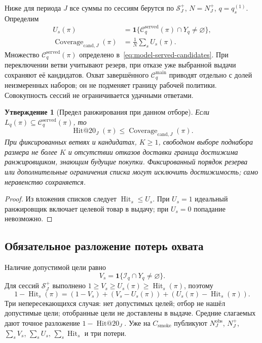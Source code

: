 \documentclass[12pt,a4paper]{article}
\newcommand{\ind}{\mathbf 1}
\theoremstyle{plainru}
\newtheorem{proposition}{Утверждение}[section]
\begin{document}
Ниже для периода $J$ все суммы по сессиям берутся по $\mathcal S_J^+$,
$N=N_J^+$, $q=q_s^{(1)}$. Определим
\begin{align}
 U_s(\pi)&=\ind\{\mathcal C_q^{\mathrm{served}}(\pi)\cap Y_q\ne\varnothing\},
 \label{eq:eval-candidate-hit}\\
 \operatorname{Coverage}_{\mathrm{cand},J}(\pi)
 &=\frac1N\sum_s U_s(\pi).
 \label{eq:eval-candidate-por}
\end{align}
Множество $\mathcal C_q^{\mathrm{served}}(\pi)$ определено
в~\eqref{eq:model-served-candidates}. При переключении ветви учитывают
резерв, при отказе уже выбранной выдачи сохраняют её кандидатов.
Охват завершённого $\mathcal C_q^{\mathrm{main}}$ приводят отдельно
с долей неизмеренных наборов; он не подменяет границу рабочей политики.
Совокупность сессий не ограничивается удачными ответами.

\begin{proposition}[Предел ранжирования при данном отборе]
\label{prop:eval-bound}
Если $L_q(\pi)\subseteq\mathcal C_q^{\mathrm{served}}(\pi)$, то
\begin{equation}\label{eq:eval-candidate-bound}
 \operatorname{Hit@20}_J(\pi)
 \le\operatorname{Coverage}_{\mathrm{cand},J}(\pi).
\end{equation}
При фиксированных ветвях и кандидатах, $K\ge1$, свободном выборе
поднабора размера не более $K$ и отсутствии отказов доставки граница
достижима ранжировщиком, знающим будущие покупки. Фиксированный порядок
резерва или дополнительные ограничения списка могут исключить достижимость;
само неравенство сохраняется.
\end{proposition}

\begin{proof}
Из вложения списков следует $\operatorname{Hit}_s\le U_s$.
При $U_s=1$ идеальный ранжировщик включает целевой товар в выдачу;
при $U_s=0$ попадание невозможно.
\end{proof}

\subsection{Обязательное разложение потерь охвата}
\label{sec:eval-loss-diagnosis}

Наличие допустимой цели равно
\begin{equation}\label{eq:eval-available-hit}
V_s=\ind\{\mathcal I_q\cap Y_q\ne\varnothing\}.
\end{equation}
Для сессий $\mathcal S_J^+$ выполнено
$1\ge V_s\ge U_s(\pi)\ge\operatorname{Hit}_s(\pi)$, поэтому
\begin{equation}\label{eq:eval-loss-decomposition}
1-\operatorname{Hit}_s(\pi)
=(1-V_s)+(V_s-U_s(\pi))+(U_s(\pi)-\operatorname{Hit}_s(\pi)).
\end{equation}
Три непересекающихся случая: нет допустимых целей; отбор не нашёл
допустимые цели; отобранные цели не доставлены в выдаче.
Средние слагаемых дают точное разложение $1-\operatorname{Hit@20}_J$.
Уже на $C_{\mathrm{smoke}}$ публикуют $N_J^{\mathrm{obs}}$, $N_J^+$,
$\sum_sV_s$, $\sum_sU_s$, $\sum_s\operatorname{Hit}_s$ и три потери.
\end{document}
